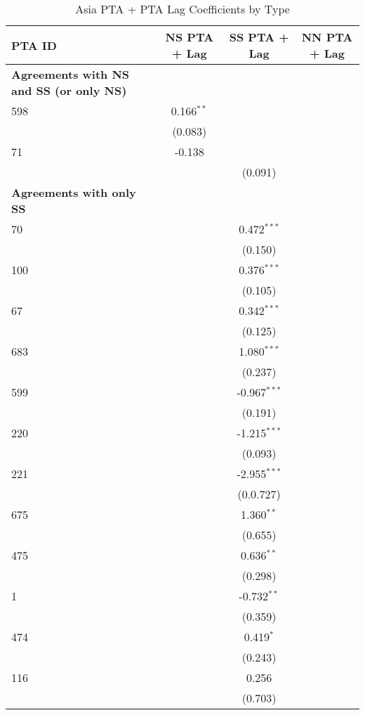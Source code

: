 \begin{table}[htbp]
    \centering
    \caption{Asia PTA + PTA Lag Coefficients by Type}
    \label{tab:asia_pta}
    \begin{adjustbox}{max width=\textwidth}
    \begin{tabular}{lccc}
    \hline
    \textbf{PTA ID} & \textbf{NS PTA + Lag} & \textbf{SS PTA + Lag} & \textbf{NN PTA + Lag} \\
    \hline
    \textbf{Agreements with NS and SS (or only NS)} &  &  &  \\
    \hline
    598 & 0.166$^{\ast\ast}$ &  &  \\
    & (0.083) &  &  \\
    71 & -0.138 &  &  \\
    &  & (0.091) &  \\
    \hline
    \textbf{Agreements with only SS} &  &  &  \\
    \hline
    70 &  & 0.472$^{\ast\ast\ast}$ &  \\
    &  & (0.150) &  \\
    100 &  & 0.376$^{\ast\ast\ast}$ &  \\
    &  & (0.105) &  \\
    67 &  & 0.342$^{\ast\ast\ast}$ &  \\
    &  & (0.125) &  \\
    683 &  & 1.080$^{\ast\ast\ast}$ &  \\
    &  & (0.237) &  \\
    599 &  & -0.967$^{\ast\ast\ast}$ &  \\
    &  & (0.191) &  \\
    220 &  & -1.215$^{\ast\ast\ast}$ &  \\
    &  & (0.093) &  \\
    221 &  & -2.955$^{\ast\ast\ast}$ &  \\
    &  & (0.0.727) &  \\
    675 &  & 1.360$^{\ast\ast}$ &  \\
    &  & (0.655) &  \\
    475 &  & 0.636$^{\ast\ast}$ &  \\
    &  & (0.298) &  \\
    1 &  & -0.732$^{\ast\ast}$ &  \\
    &  & (0.359) &  \\
    474 &  & 0.419$^{\ast}$ &  \\
    &  & (0.243) &  \\
    116 &  & 0.256 &  \\
    &  & (0.703) &  \\

\end{tabular}
\end{adjustbox}
\end{table}
